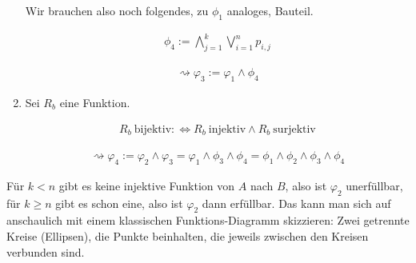 \begin{solution}
\begin{enumerate}[label = \arabic*.]
  Wir brauchen also noch folgendes, zu $\phi_1$ analoges, Bauteil.

  \begin{align*}
    \phi_4
    :=
    \bigwedge_{j=1}^k \bigvee_{i=1}^np_{i,j}
  \end{align*}

  \begin{align*}
    \rightsquigarrow
    \varphi_3
    :=
    \varphi_1 \land \phi_4
  \end{align*}


  \item Sei $R_b$ eine Funktion.

  \begin{align*}
    R_b ~\text{bijektiv}
    :\iff
    R_b ~\text{injektiv}
    \land
    R_b ~\text{surjektiv}
  \end{align*}

  \begin{align*}
    \rightsquigarrow
    \varphi_4
    :=
    \varphi_2 \land \varphi_3
    =
    \varphi_1 \land \phi_3 \land \phi_4
    =
    \phi_1 \land \phi_2 \land \phi_3 \land \phi_4
  \end{align*}

\end{enumerate}

Für $k < n$ gibt es keine injektive Funktion von $A$ nach $B$, also ist $\varphi_2$ unerfüllbar, für $k \geq n$ gibt es schon eine, also ist $\varphi_2$ dann erfüllbar.
Das kann man sich auf anschaulich mit einem klassischen Funktions-Diagramm skizzieren:
Zwei getrennte Kreise (Ellipsen), die Punkte beinhalten, die jeweils zwischen den Kreisen verbunden sind.

\end{solution}


